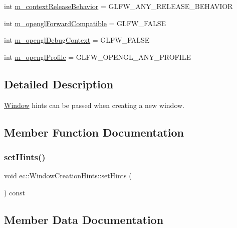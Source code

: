 \begin{DoxyCompactItemize}
\item 
int \mbox{\hyperlink{structec_1_1_window_creation_hints_ac3b3b32240eea7148924b944bea146af}{m\+\_\+context\+Release\+Behavior}} = G\+L\+F\+W\+\_\+\+A\+N\+Y\+\_\+\+R\+E\+L\+E\+A\+S\+E\+\_\+\+B\+E\+H\+A\+V\+I\+OR
\item 
int \mbox{\hyperlink{structec_1_1_window_creation_hints_abfa30a3da29c0037255bb90e5b6a6866}{m\+\_\+opengl\+Forward\+Compatible}} = G\+L\+F\+W\+\_\+\+F\+A\+L\+SE
\item 
int \mbox{\hyperlink{structec_1_1_window_creation_hints_a87a7f6e29e26ba7126e7064e1e60e957}{m\+\_\+opengl\+Debug\+Context}} = G\+L\+F\+W\+\_\+\+F\+A\+L\+SE
\item 
int \mbox{\hyperlink{structec_1_1_window_creation_hints_a872785f08bf23d138d7cc61279ba928c}{m\+\_\+opengl\+Profile}} = G\+L\+F\+W\+\_\+\+O\+P\+E\+N\+G\+L\+\_\+\+A\+N\+Y\+\_\+\+P\+R\+O\+F\+I\+LE
\end{DoxyCompactItemize}


\subsection{Detailed Description}
\mbox{\hyperlink{classec_1_1_window}{Window}} hints can be passed when creating a new window. 

\subsection{Member Function Documentation}
\mbox{\label{structec_1_1_window_creation_hints_ae62c9820ab420fb7ada244293c6ffa27}} 
\subsubsection{\texorpdfstring{set\+Hints()}{setHints()}}
{\footnotesize\ttfamily void ec\+::\+Window\+Creation\+Hints\+::set\+Hints (\begin{DoxyParamCaption}{ }\end{DoxyParamCaption}) const}



\subsection{Member Data Documentation}
\mbox{\label{structec_1_1_window_creation_hints_a41a825d31e2251b3ddcade624bc7eb20}} 
